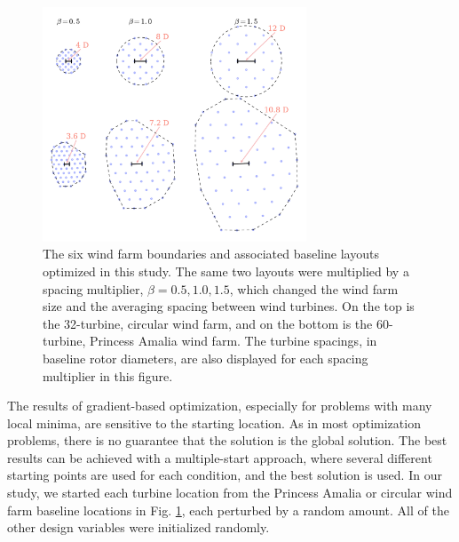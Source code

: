 \documentclass[wes, manuscript]{copernicus}
\begin{document}
\begin{figure}[htbp]
  \centering
  \includegraphics[width=0.7\textwidth]{Figures/spacing_multipliers.pdf}
  \caption{\label{farm_spacings}The six wind farm boundaries and associated baseline layouts optimized in this study. The same two layouts were multiplied by a spacing multiplier, $\beta=0.5,1.0,1.5$, which changed the wind farm size and the averaging spacing between wind turbines.  On the top is the 32-turbine, circular wind farm, and on the bottom is the 60-turbine, Princess Amalia wind farm. The turbine spacings, in baseline rotor diameters, are also displayed for each spacing multiplier in this figure.}
\end{figure}

The results of gradient-based optimization, especially for problems with many local minima, are sensitive to the starting location. As in most optimization problems, there is no guarantee that the solution is the global solution. The best results can be achieved with a multiple-start approach, where several different starting points are used for each condition, and the best solution is used. In our study, we started each turbine location from the Princess Amalia or circular wind farm baseline locations in Fig. \ref{farm_spacings}, each perturbed by a random amount. All of the other design variables were initialized randomly.


\end{document}
